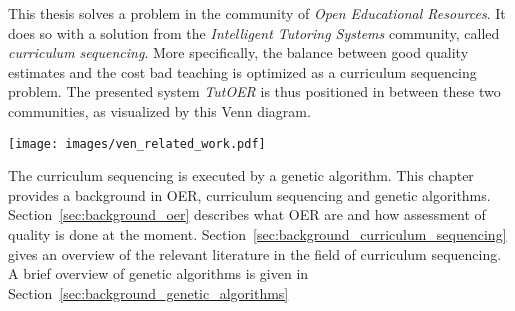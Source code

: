 This thesis solves a problem in the community of \emph{Open Educational
Resources}. It does so with a solution from the \emph{Intelligent Tutoring
Systems} community, called \emph{curriculum sequencing}. More specifically,
the balance between good quality estimates and the cost bad teaching is
optimized as a curriculum sequencing problem. The presented system
\emph{TutOER} is thus positioned in between these two communities, as
visualized by this Venn diagram.\\
\begin{center}
\texttt{[image: images/ven\_related\_work.pdf]}
\end{center}
\noindent
The curriculum sequencing is executed by a genetic algorithm. This chapter
provides a background in OER, curriculum sequencing and genetic algorithms.
Section~\ref{sec:background_oer} describes what OER are and how assessment of
quality is done at the moment.
Section~\ref{sec:background_curriculum_sequencing} gives an overview of the
relevant literature in the field of curriculum sequencing. A brief overview of
genetic algorithms is given in Section~\ref{sec:background_genetic_algorithms}

